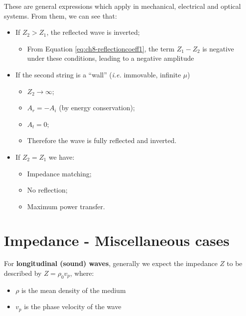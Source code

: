 \documentclass[
]{book}
\providecommand{\tightlist}{%
  \setlength{\itemsep}{0pt}\setlength{\parskip}{0pt}}
\begin{document}
These are general expressions which apply in mechanical, electrical and optical systems. From them, we can see that:

\begin{itemize}
\tightlist
\item
  If \(Z_2 > Z_1\), the reflected wave is inverted;

  \begin{itemize}
  \tightlist
  \item
    From Equation \eqref{eq:ch8-reflectioncoeff1}, the term \(Z_1 - Z_2\) is negative under these conditions, leading to a negative amplitude
  \end{itemize}
\item
  If the second string is a ``wall'' (\emph{i.e.} immovable, infinite \(\mu\))

  \begin{itemize}
  \tightlist
  \item
    \(Z_2 \rightarrow \infty\);
  \item
    \(A_r = - A_i\) (by energy conservation);
  \item
    \(A_t = 0\);
  \item
    Therefore the wave is fully reflected and inverted.
  \end{itemize}
\item
  If \(Z_2 = Z_1\) we have:

  \begin{itemize}
  \tightlist
  \item
    Impedance matching;
  \item
    No reflection;
  \item
    Maximum power transfer.
  \end{itemize}
\end{itemize}

\hypertarget{sec:ch8-impedancemisccases}{%
\section{Impedance - Miscellaneous cases}\label{sec:ch8-impedancemisccases}}

For \textbf{longitudinal (sound) waves}, generally we expect the impedance \(Z\) to be described by \(Z = \rho_0 v_p\), where:

\begin{itemize}
\tightlist
\item
  \(\rho\) is the mean density of the medium
\item
  \(v_p\) is the phase velocity of the wave
\end{itemize}
\end{document}
